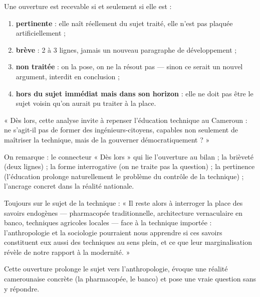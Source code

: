 \documentclass[11pt]{article}
\begin{document}
\begin{propriete}
Une ouverture est recevable si et seulement si elle est :
\begin{enumerate}
\item \textbf{pertinente} : elle naît réellement du sujet traité, elle n'est pas plaquée artificiellement ;
\item \textbf{brève} : 2 à 3 lignes, jamais un nouveau paragraphe de développement ;
\item \textbf{non traitée} : on la pose, on ne la résout pas — sinon ce serait un nouvel argument, interdit en conclusion ;
\item \textbf{hors du sujet immédiat mais dans son horizon} : elle ne doit pas être le sujet voisin qu'on aurait pu traiter à la place.
\end{enumerate}
\end{propriete}

\begin{exemplebox}
« Dès lors, cette analyse invite à repenser l'éducation technique au Cameroun : ne s'agit-il pas de former des ingénieurs-citoyens, capables non seulement de maîtriser la technique, mais de la gouverner démocratiquement ? »

On remarque : le connecteur « Dès lors » qui lie l'ouverture au bilan ; la brièveté (deux lignes) ; la forme interrogative (on ne traite pas la question) ; la pertinence (l'éducation prolonge naturellement le problème du contrôle de la technique) ; l'ancrage concret dans la réalité nationale.
\end{exemplebox}

\begin{exemplebox}
Toujours sur le sujet de la technique : « Il reste alors à interroger la place des savoirs endogènes — pharmacopée traditionnelle, architecture vernaculaire en banco, techniques agricoles locales — face à la technique importée : l'anthropologie et la sociologie pourraient nous apprendre si ces savoirs constituent eux aussi des techniques au sens plein, et ce que leur marginalisation révèle de notre rapport à la modernité. »

Cette ouverture prolonge le sujet vers l'anthropologie, évoque une réalité camerounaise concrète (la pharmacopée, le banco) et pose une vraie question sans y répondre.
\end{exemplebox}
\end{document}

